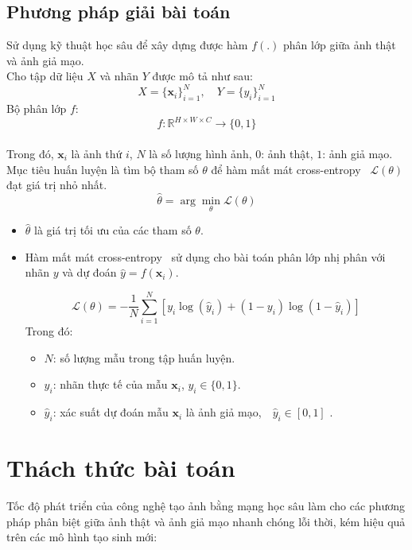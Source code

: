 \subsection{Phương pháp giải bài toán}
Sử dụng kỹ thuật học sâu để xây dựng được hàm $f(.)$ phân lớp giữa ảnh thật và ảnh giả mạo.\\
%
Cho tập dữ liệu \( X \) và nhãn \( Y \) được mô tả như sau:
\[ X = \{ \mathbf{x}_i \}_{i=1}^{N}, \quad Y = \{ y_i \}_{i=1}^{N} \]
Bộ phân lớp \( f \):
\[
f: \mathbb{R}^{H \times W \times C} \to \{0, 1\}
\]\\
%
Trong đó, $\mathbf{x}_i$ là ảnh thứ $i$, $N$ là số lượng hình ảnh, $0$: ảnh thật, $1$: ảnh giả mạo. \\
%
Mục tiêu huấn luyện là tìm bộ tham số \(\theta\) để hàm mất mát cross-entropy~\cite{2023arXiv230407288M} \(\mathcal{L}(\theta)\) đạt giá trị nhỏ nhất.
\[
\hat{\theta} = \arg \min_{\theta} \mathcal{L}(\theta)
\]


\begin{itemize}
	\item \(\hat{\theta}\) là giá trị tối ưu của các tham số \(\theta\).
	\item Hàm mất mát cross-entropy~\cite{2023arXiv230407288M} sử dụng cho bài toán phân lớp nhị phân với nhãn $y$ và dự đoán $\hat{y} = f(\mathbf{x}_i) $.
	
	\[
	\mathcal{L}(\theta) = -\frac{1}{N} \sum_{i=1}^{N} \left[ y_i \log(\hat{y}_i) + (1 - y_i) \log(1 - \hat{y}_i) \right]
	\]
	Trong đó:
	\begin{itemize}
		\item \(N\): số lượng mẫu trong tập huấn luyện.
		\item \(y_i\): nhãn thực tế của mẫu $\mathbf{x}_i$, \quad \(y_i \in \{0, 1\}\).
		\item \(\hat{y}_i\): xác suất dự đoán mẫu $\mathbf{x}_i$ là ảnh giả mạo,$\quad \hat{y}_i \in [0, 1]$ .
	\end{itemize}
\end{itemize}
%
%
\section{Thách thức bài toán}

Tốc độ phát triển của công nghệ tạo ảnh bằng mạng học sâu làm cho các phương pháp phân biệt giữa ảnh thật và ảnh giả mạo nhanh chóng lỗi thời, kém hiệu quả trên các mô hình tạo sinh mới:

